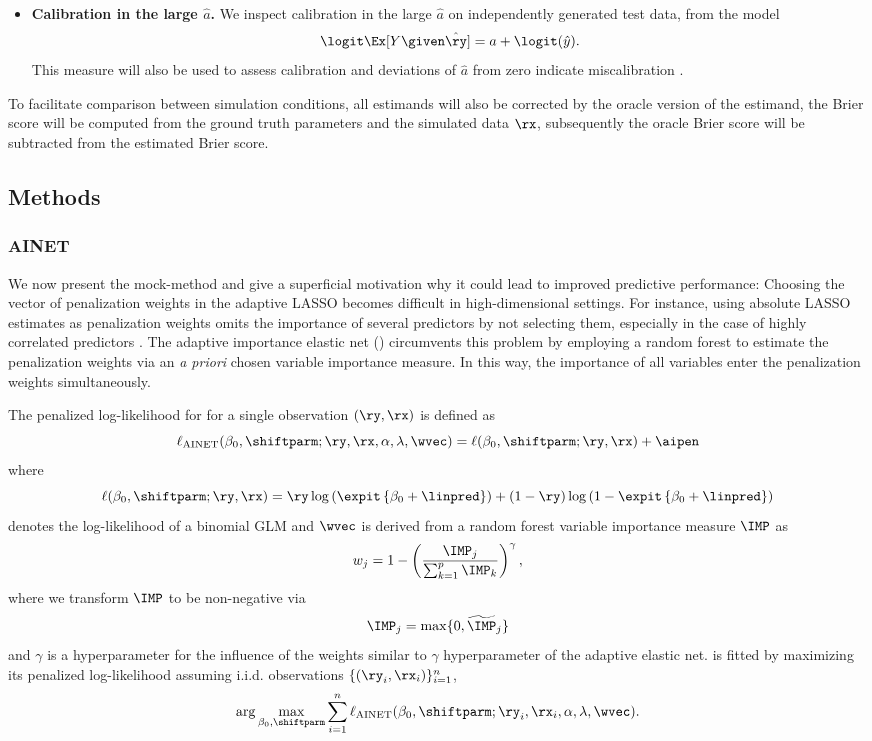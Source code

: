 \begin{subappendices}
\begin{itemize}
  \item \textbf{Calibration in the large $\hat a$.} We inspect calibration in the
  large $\hat a$ on independently generated test data, from the model
  $$\logit\Ex[Y \given \hat\ry] = a + \logit(\hat{y}).$$
        This measure will also be used to assess calibration and deviations of
        $\hat a$ from zero indicate miscalibration \citep{Steyerberg2019}.
\end{itemize}

To facilitate comparison between simulation conditions, all estimands will also
be corrected by the oracle version of the estimand, \eg{} the Brier score will
be computed from the ground truth parameters and the simulated data $\rx$,
subsequently the oracle Brier score will be subtracted from the estimated Brier
score.

\subsection{Methods} \label{sec6:methods}

\subsubsection{AINET}
We now present the mock-method and give a superficial motivation why it could
lead to improved predictive performance: Choosing the vector of penalization
weights in the adaptive LASSO becomes difficult in high-dimensional settings.
For instance, using absolute LASSO estimates as penalization weights omits the
importance of several predictors by not selecting them, especially in the case
of highly correlated predictors \citep{Algamal2015}. The adaptive importance
elastic net (\ainet{}) circumvents this problem by employing a random forest to
estimate the penalization weights via an \emph{a priori} chosen variable
importance measure. In this way, the importance of all variables enter the
penalization weights simultaneously.

The penalized log-likelihood for \ainet{} for a single observation $(\ry, \rx)$
is defined as
$$\ell_{\text{AINET}}(\beta_0, \shiftparm; \ry, \rx, \alpha, \lambda, \wvec) =
  \ell(\beta_0, \shiftparm; \ry, \rx) + \aipen$$
where
$$\ell(\beta_0, \shiftparm; \ry, \rx) =
\ry \log\left(\expit\left\{\beta_0 + \linpred\right\}\right) + (1 - \ry) \log\left(1 - \expit\left\{\beta_0 + \linpred\right\}\right)$$
denotes the log-likelihood of a binomial GLM and $\wvec$ is derived from a
random forest variable importance measure $\IMP$ as
$$w_j = 1 - \left(\frac{\IMP_j}{\sum_{k=1}^p \IMP_k}\right)^\gamma,$$
where we transform $\IMP$ to be non-negative via
$$\IMP_j = \max\{0, \widetilde\IMP_j\}$$
and $\gamma$ is a hyperparameter for the influence of the weights similar to
$\gamma$ hyperparameter of the adaptive elastic net. \ainet{} is fitted by
maximizing its penalized log-likelihood assuming i.i.d. observations
$\{(\ry_i, \rx_i)\}_{i=1}^n$, \ie
$$\arg\max_{\beta_0, \shiftparm} \sum_{i = 1}^n \ell_{\text{AINET}}(\beta_0,
\shiftparm; \ry_i, \rx_i, \alpha, \lambda, \wvec).$$


\end{subappendices}
